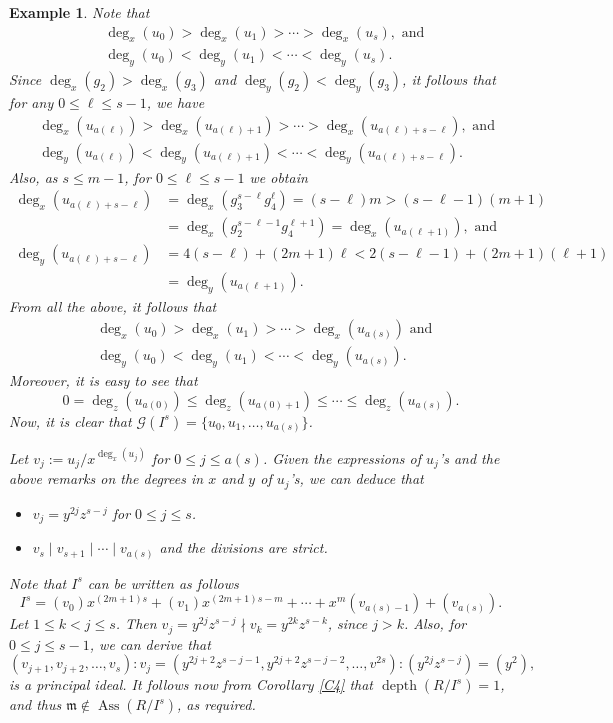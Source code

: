\documentclass[11pt]{amsart}
\newtheorem{example}[theorem]{Example}
\def\Ass{\operatorname{Ass}}
\def\depth{\operatorname{depth}}
\begin{document}
\begin{example}
{		 Note that 
		 \begin{align*}
		 & \deg_x(u_0)>\deg_x(u_1)>\cdots>\deg_x(u_s),   \text{ and }\\
		 &  \deg_y(u_0)<\deg_y(u_1)<\cdots<\deg_y(u_s).
		 \end{align*}
     Since $\deg_x(g_2)>\deg_x(g_3)$ and $\deg_y(g_2)<\deg_y(g_3)$, it follows that for any $0\leq \ell\leq s-1$, we have
		 		 \begin{align*} 
		 & \deg_x(u_{a(\ell)})>\deg_x(u_{a(\ell)+1})>\cdots>\deg_x(u_{a(\ell)+s-\ell}), \text{ and}\\
		 & \deg_y(u_{a(\ell)})<\deg_y(u_{a(\ell)+1})<\cdots<\deg_y(u_{a(\ell)+s-\ell}).
		 \end{align*}
		 Also, as $s\leq m-1$, for $0\leq \ell \leq s-1$ we obtain 
     \begin{align*}		
		  \deg_x(u_{a(\ell)+s-\ell})&=\deg_x(g_3^{s-\ell}g_4^{\ell})=(s-\ell)m > (s-\ell-1)(m+1) \\
			                          &=\deg_x(g_2^{s-\ell-1}g_4^{\ell+1}) =\deg_x(u_{a(\ell+1)}), \text{ and }\\
		  \deg_y(u_{a(\ell)+s-\ell})& =4(s-\ell) + (2m+1)\ell < 2(s-\ell-1) + (2m+1)(\ell+1) \\
		                            &  =\deg_y(u_{a(\ell+1)}).
		 \end{align*}
		 From all the above,   it follows that
		 \begin{align*}
		 & \deg_x(u_0)>\deg_x(u_1)>\cdots>\deg_x(u_{a(s)})\text{ and }\\
		 & \deg_y(u_0)<\deg_y(u_1)<\cdots<\deg_y(u_{a(s)}).
		 \end{align*}
		 Moreover, it is easy to see that 
		 $$ 0=\deg_z(u_{a(0)}) \leq \deg_z(u_{a(0)+1}) \leq \cdots \leq \deg_z(u_{a(s)}).$$
		 Now, it is clear that $\mathcal G(I^s)=\{u_0,u_1,\ldots,u_{a(s)}\}$.
		 
		 Let $v_j:=u_j / x^{\deg_x(u_j)}$ for $0\leq j\leq a(s)$. Given the expressions of $u_j$'s and the above 
		 remarks on the degrees in $x$ and $y$ of $u_j$'s, we can deduce that 
		 \begin{itemize}
		 \item $v_j = y^{2j}z^{s-j}$  for $0\leq j\leq s$.
		 \item $v_{s} \mid v_{s+1} \mid \cdots \mid v_{a(s)}$ and the divisions are strict.
		 \end{itemize}
		 Note that $I^s$ can be written as follows  
		 $$I^s = (v_0)x^{(2m+1)s} + (v_1)x^{(2m+1)s-m} + \cdots + x^{m}(v_{a(s)-1}) + (v_{a(s)}).$$
		 Let $1\leq k<j\leq s$. Then $v_j = y^{2j}z^{s-j}\nmid v_k = y^{2k}z^{s-k}$, since $j>k$. 		 
		 Also, for $0\leq j\leq s-1$, we can derive that 
		 $$(v_{j+1},v_{j+2},\ldots,v_s):v_j = (y^{2j+2}z^{s-j-1},y^{2j+2}z^{s-j-2},\ldots,v^{2s}):(y^{2j}z^{s-j}) = (y^2),$$
		 is a principal ideal. It follows now   from Corollary \ref{C4}  that $\depth(R/I^s)=1$, and thus $\mathfrak m\notin \Ass(R/I^s)$,
		 as required.
    }
\end{example}
\end{document}
